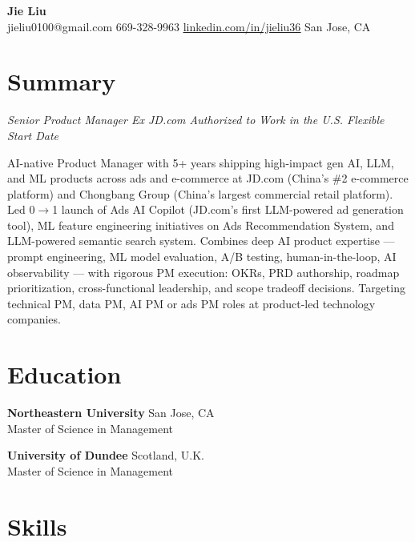 \documentclass[10pt, letterpaper]{article}
\newcommand{\linkedinlink}[2]{\href{#1}{\textcolor{accent}{\uline{#2}}}}
\begin{document}
\begin{center}
    {\LARGE\bfseries\color{primary} Jie Liu}\\[3pt]
    \small
    jieliu0100@gmail.com \textbar{}
    669-328-9963 \textbar{}
    \linkedinlink{https://www.linkedin.com/in/jieliu36/}{linkedin.com/in/jieliu36} \textbar{}
    San Jose, CA
\end{center}

\section{Summary}

\textit{Senior Product Manager \textbar{} Ex JD.com \textbar{} Authorized to Work in the U.S. \textbar{} Flexible Start Date}

AI-native Product Manager with 5+ years shipping high-impact gen AI, LLM, and ML products across ads and e-commerce at JD.com (China's \#2 e-commerce platform) and Chongbang Group (China's largest commercial retail platform). Led 0$\rightarrow$1 launch of Ads AI Copilot (JD.com's first LLM-powered ad generation tool), ML feature engineering initiatives on Ads Recommendation System, and LLM-powered semantic search system. Combines deep AI product expertise --- prompt engineering, ML model evaluation, A/B testing, human-in-the-loop, AI observability --- with rigorous PM execution: OKRs, PRD authorship, roadmap prioritization, cross-functional leadership, and scope tradeoff decisions. Targeting technical PM, data PM, AI PM or ads PM roles at product-led technology companies.

\section{Education}

\textbf{Northeastern University} \hfill San Jose, CA\\
Master of Science in Management 

\smallskip

\textbf{University of Dundee} \hfill Scotland, U.K.\\
Master of Science in Management

\section{Skills}
\end{document}
